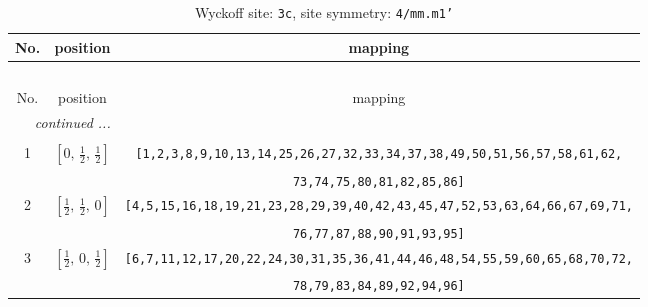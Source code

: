 \documentclass[fleqn,8pt]{jsarticle}
\begin{document}
\renewcommand{\arraystretch}{1.2}
\begin{longtable}{ccc}
\caption{Wyckoff site: {\tt 3c}, site symmetry: {\tt 4/mm.m1'}}
 \\
 \hline \hline
No. & position & mapping \\ \hline \endfirsthead

\multicolumn{2}{l}{\tablename\ \thetable{}} \\
 \hline \hline
No. & position & mapping \\ \hline \endhead

 \hline \hline
\multicolumn{2}{r}{\footnotesize\it continued ...} \\ \endfoot

 \hline \hline
\multicolumn{2}{r}{} \\ \endlastfoot

1 & $\left[ 0,\, \frac{1}{2},\, \frac{1}{2} \right]$ & {\tt [1,2,3,8,9,10,13,14,25,26,27,32,33,34,37,38,49,50,51,56,57,58,61,62,} \\ \hline
 &  & {\tt 73,74,75,80,81,82,85,86]} \\ \hline
2 & $\left[ \frac{1}{2},\, \frac{1}{2},\, 0 \right]$ & {\tt [4,5,15,16,18,19,21,23,28,29,39,40,42,43,45,47,52,53,63,64,66,67,69,71,} \\ \hline
 &  & {\tt 76,77,87,88,90,91,93,95]} \\ \hline
3 & $\left[ \frac{1}{2},\, 0,\, \frac{1}{2} \right]$ & {\tt [6,7,11,12,17,20,22,24,30,31,35,36,41,44,46,48,54,55,59,60,65,68,70,72,} \\ \hline
 &  & {\tt 78,79,83,84,89,92,94,96]} \\
\end{longtable}
\renewcommand{\arraystretch}{1.2}
\end{document}
